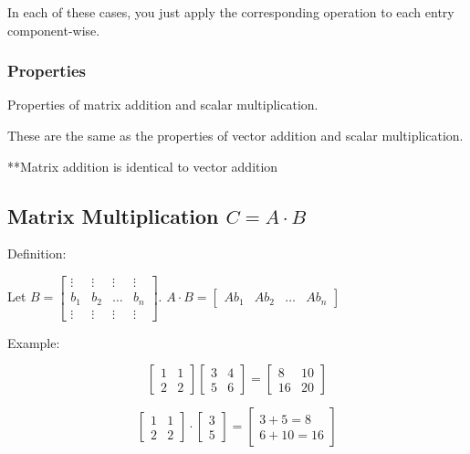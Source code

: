 \documentclass[12pt]{article}
\begin{document}
In each of these cases, you just apply the corresponding operation to each entry
component-wise.

\subsubsection{Properties}

Properties of matrix addition and scalar multiplication.

These are the same as the properties of vector addition and scalar multiplication.

**Matrix addition is identical to vector addition

\subsection{Matrix Multiplication $C = A \cdot B$}

Definition:

Let $B = \begin{bmatrix}
  \vdots & \vdots & \vdots & \vdots \\
  b_{1} & b_{2} & \dots & b_{n} \\
  \vdots & \vdots & \vdots & \vdots
\end{bmatrix}$. 
$A \cdot B = \begin{bmatrix} Ab_1 & Ab_2 & \dots & Ab_n\end{bmatrix}$

Example:

\begin{equation*}
  \begin{bmatrix}
    1 & 1 \\ 
    2 & 2
  \end{bmatrix}
  \begin{bmatrix}
    3 & 4 \\ 
    5 & 6
  \end{bmatrix}
  =
  \begin{bmatrix}
    8 & 10 \\ 
    16 & 20
  \end{bmatrix}
\end{equation*}

\begin{equation*}
  \begin{bmatrix}
    1 & 1 \\ 
    2 & 2
  \end{bmatrix}
  \cdot
  \begin{bmatrix}
    3 \\ 5
  \end{bmatrix}
  =
  \begin{bmatrix}
    3 + 5 = 8 \\
    6 + 10 = 16
  \end{bmatrix}
\end{equation*}
\end{document}
